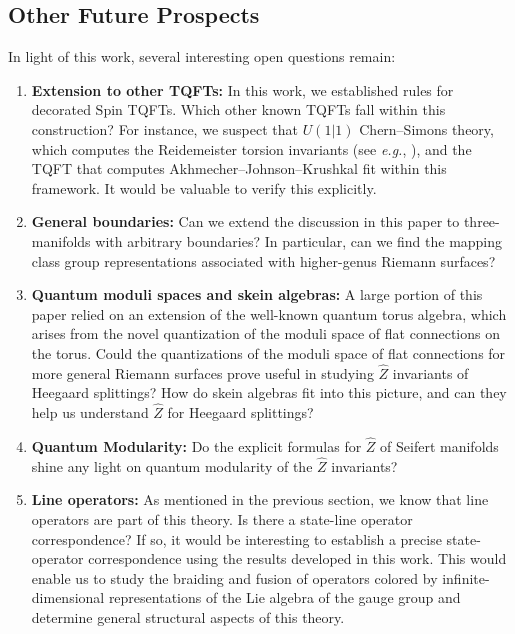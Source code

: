 \documentclass{article}
\numberwithin{corollary}{theorem}
\numberwithin{corollary}{proposition}
\begin{document}




\subsection{Other Future Prospects}
In light of this work, several interesting open questions remain:
\begin{enumerate}
    \item \textbf{Extension to other TQFTs:} In this work, we established rules for decorated $\mathrm{Spin}$ TQFTs. Which other known TQFTs fall within this construction? For instance, we suspect that $U(1|1)$ Chern--Simons theory, which computes the Reidemeister torsion invariants (see \textit{e.g.}, \cite{Mik}), and the TQFT that computes Akhmecher--Johnson--Krushkal \cite{AJK} fit within this framework. It would be valuable to verify this explicitly.
    \item \textbf{General boundaries:} Can we extend the discussion in this paper to three-manifolds with arbitrary boundaries? In particular, can we find the mapping class group representations associated with higher-genus Riemann surfaces?
    \item \textbf{Quantum moduli spaces and skein algebras:} A large portion of this paper relied on an extension of the well-known quantum torus algebra, which arises from the novel quantization of the moduli space of flat connections on the torus. Could the quantizations of the moduli space of flat connections for more general Riemann surfaces prove useful in studying $\hat{Z}$ invariants of Heegaard splittings? How do skein algebras fit into this picture, and can they help us understand $\hat{Z}$ for Heegaard splittings?
    \item \textbf{Quantum Modularity:} Do the explicit formulas for $\hat{Z}$ of Seifert manifolds shine any light on quantum modularity of the $\hat{Z}$ invariants?
    \item \textbf{Line operators:} As mentioned in the previous section, we know that line operators are part of this theory. Is there a state-line operator correspondence? If so, it would be interesting to establish a precise state-operator correspondence using the results developed in this work. This would enable us to study the braiding and fusion of operators colored by infinite-dimensional representations of the Lie algebra of the gauge group and determine general structural aspects of this theory.  
\end{enumerate}
\end{document}
